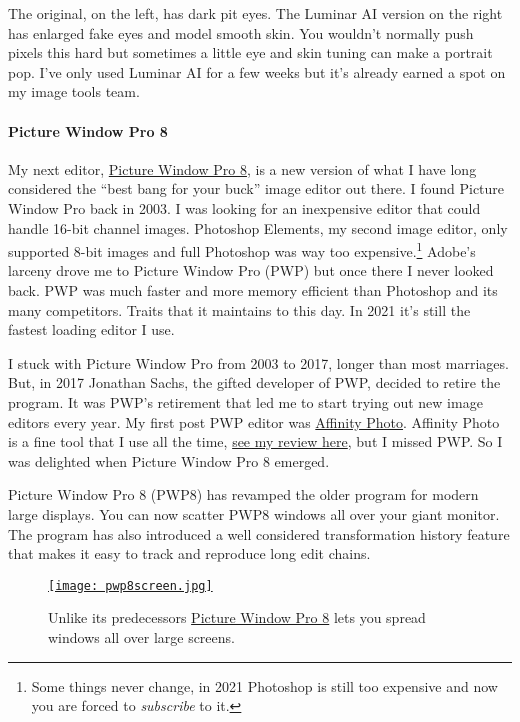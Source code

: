 The original, on the left, has dark pit eyes. The Luminar AI version on
the right has enlarged fake eyes and model smooth skin. You wouldn't
normally push pixels this hard but sometimes a little eye and skin
tuning can make a portrait pop. I've only used Luminar AI for a few
weeks but it's already earned a spot on my image tools team.

\paragraph{Picture Window Pro 8}\label{picture-window-pro-8}

My next editor, \href{https://www.dl-c.com/Downloads.html}{Picture
Window Pro 8}, is a new version of what I have long considered the
``best bang for your buck'' image editor out there. I found Picture
Window Pro back in 2003. I was looking for an inexpensive editor that
could handle 16-bit channel images. Photoshop Elements, my second image
editor, only supported 8-bit images and full Photoshop was way too
expensive.\footnote{Some things never change, in 2021 Photoshop is still too expensive and
  now you are forced to \emph{subscribe} to
  it.} Adobe's larceny
drove me to Picture Window Pro (PWP) but once there I never looked
back. PWP was much faster and more memory efficient than Photoshop and
its many competitors. Traits that it maintains to this day. In 2021
it's still the fastest loading editor I use.

I stuck with Picture Window Pro from 2003 to 2017, longer than most
marriages. But, in 2017 Jonathan Sachs, the gifted developer of PWP,
decided to retire the program. It was PWP's retirement that led me to
start trying out new image editors every year. My first post PWP editor
was \href{https://affinity.serif.com/en-gb/photo/}{Affinity Photo}.
Affinity Photo is a fine tool that I use all the time,
\href{https://analyzethedatanotthedrivel.org/2017/01/22/affinity-photo-review/}{see
my review here}, but I missed PWP. So I was delighted when Picture
Window Pro 8 emerged.

Picture Window Pro 8 (PWP8) has revamped the older program for modern
large displays. You can now scatter PWP8 windows all over your giant
monitor. The program has also introduced a well considered
transformation history feature that makes it easy to track and reproduce
long edit chains.


\captionsetup[figure]{labelformat=empty}
 \begin{SCfigure}[50]
 \centering
\href{https://bakerjd99.files.wordpress.com/2021/01/pwp8screen.jpg}{\texttt{[image: pwp8screen.jpg]}}
\caption[\href{https://www.dl-c.com/Downloads.html}{Picture Window Pro 8} lets you spread  windows over large screens.]{Unlike its predecessors \href{https://www.dl-c.com/Downloads.html}{Picture Window Pro 8} lets you spread windows all over large screens.} 
\label{fig:7048X4}
\end{SCfigure}


